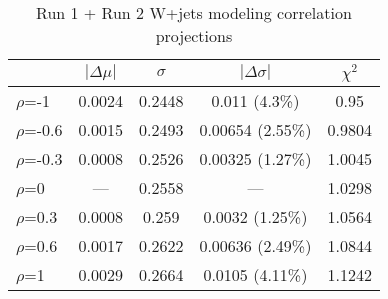 \begin{table}[!htbp]\captionsetup{justification=centering}
\begin{center}\begin{tabular}{lcccc}
\hline\hline
 & $\left|\Delta\mu\right|$ & $\sigma$ & $\left|\Delta\sigma\right|$ & $\chi^2$\\
\hline
$\rho$=-1 & 0.0024 & 0.2448 & 0.011 (4.3\%) & 0.95\\
$\rho$=-0.6 & 0.0015 & 0.2493 & 0.00654 (2.55\%) & 0.9804\\
$\rho$=-0.3 & 0.0008 & 0.2526 & 0.00325 (1.27\%) & 1.0045\\
$\rho$=0 & --- & 0.2558 & --- & 1.0298\\
$\rho$=0.3 & 0.0008 & 0.259 & 0.0032 (1.25\%) & 1.0564\\
$\rho$=0.6 & 0.0017 & 0.2622 & 0.00636 (2.49\%) & 1.0844\\
$\rho$=1 & 0.0029 & 0.2664 & 0.0105 (4.11\%) & 1.1242\\
\hline\hline
\end{tabular}
\caption{Run 1 + Run 2 W+jets modeling correlation projections}
\label{tab:wjets_correlation}
\end{center}
\end{table}

